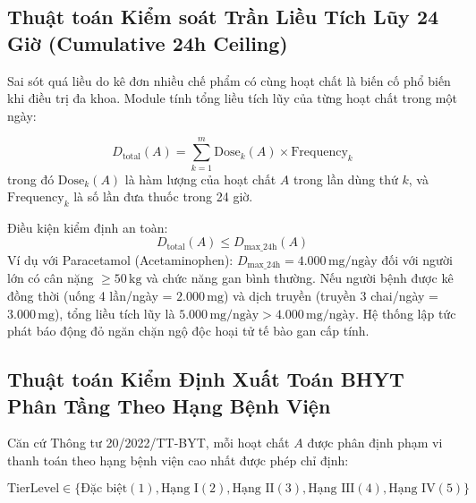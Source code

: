 \subsection{Thuật toán Kiểm soát Trần Liều Tích Lũy 24 Giờ (Cumulative 24h Ceiling)}
\label{subsec:cumulative_dose_ceiling}

Sai sót quá liều do kê đơn nhiều chế phẩm có cùng hoạt chất là biến cố phổ biến khi điều trị đa khoa. Module  tính tổng liều tích lũy của từng hoạt chất trong một ngày:

\begin{equation}
    D_{\text{total}}(A) = \sum_{k=1}^m \text{Dose}_k(A) \times \text{Frequency}_k
\end{equation}
trong đó $\text{Dose}_k(A)$ là hàm lượng của hoạt chất $A$ trong lần dùng thứ $k$, và $\text{Frequency}_k$ là số lần đưa thuốc trong 24 giờ.

Điều kiện kiểm định an toàn:
\begin{equation}
    D_{\text{total}}(A) \le D_{\text{max\_24h}}(A)
\end{equation}
Ví dụ với Paracetamol (Acetaminophen): $D_{\text{max\_24h}} = 4.000\,\text{mg/ngày}$ đối với người lớn có cân nặng $\ge 50\,\text{kg}$ và chức năng gan bình thường. Nếu người bệnh được kê đồng thời  (uống 4 lần/ngày = $2.000\,\text{mg}$) và dịch truyền  (truyền 3 chai/ngày = $3.000\,\text{mg}$), tổng liều tích lũy là $5.000\,\text{mg/ngày} > 4.000\,\text{mg/ngày}$. Hệ thống lập tức phát báo động đỏ ngăn chặn ngộ độc hoại tử tế bào gan cấp tính.

\subsection{Thuật toán Kiểm Định Xuất Toán BHYT Phân Tầng Theo Hạng Bệnh Viện}
\label{subsec:bhyt_audit_algorithm}

Căn cứ Thông tư 20/2022/TT-BYT, mỗi hoạt chất $A$ được phân định phạm vi thanh toán theo hạng bệnh viện cao nhất được phép chỉ định:

\begin{equation}
    \text{TierLevel} \in \{\text{Đặc biệt} (1), \text{Hạng I} (2), \text{Hạng II} (3), \text{Hạng III} (4), \text{Hạng IV} (5)\}
\end{equation}

